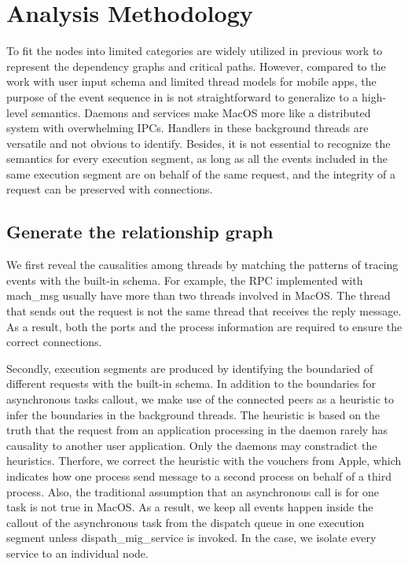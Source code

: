 \section{Analysis Methodology}
To fit the nodes into limited categories are widely utilized in previous work to represent the dependency graphs and critical paths\cite{Magpie, AppInsight, Panaappticon}.
However, compared to the work with user input schema and limited thread models for mobile apps, the purpose of the event sequence in \xxx is not straightforward to generalize to a high-level semantics.
Daemons and services make MacOS more like a distributed system with overwhelming IPCs.
Handlers in these background threads are versatile and not obvious to identify.
Besides, it is not essential to recognize the semantics for every execution segment, as long as all the events included in the same execution segment are on behalf of the same request, and the integrity of a request can be preserved with connections.

\subsection{Generate the relationship graph}
We first reveal the causalities among threads by matching the patterns of tracing events with the built-in schema.
For example, the RPC implemented with mach\_msg usually have more than two threads involved in MacOS. 
The thread that sends out the request is not the same thread that receives the reply message.
As a result, both the ports and the process information are required to ensure the correct connections.

Secondly, execution segments are produced by identifying the boundaried of different requests with the built-in schema.
In addition to the boundaries for asynchronous tasks callout, we make use of the connected peers as a heuristic to infer the boundaries in the background threads.
The heuristic is based on the truth that the request from an application processing in the daemon rarely has causality to another user application.
Only the daemons may constradict the heuristics.
Therfore, we correct the heuristic with the vouchers from Apple, which indicates how one process send message to a second process on behalf of a third process. 
Also, the traditional assumption that an asynchronous call is for one task is not true in MacOS.
As a result, we keep all events happen inside the callout of the asynchronous task from the dispatch queue in one execution segment unless dispath\_mig\_service is invoked.
In the case, we isolate every service to an individual node.

